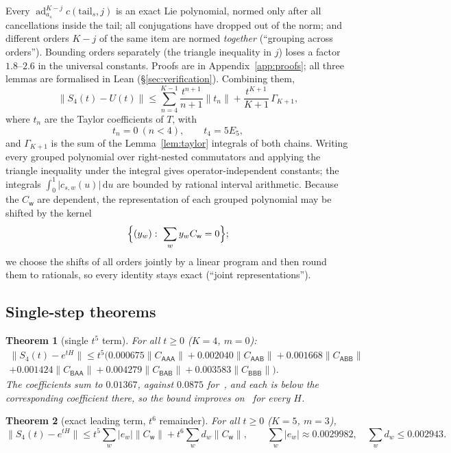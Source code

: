 \documentclass[11pt]{article}
\newcommand{\ad}{\operatorname{ad}}
\newcommand{\norm}[1]{\lVert #1\rVert}
\newcommand{\abs}[1]{\lvert #1\rvert}
\newcommand{\C}[1]{C_{\mathsf{#1}}}
\newcommand{\dd}{\,\mathrm{d}}
\theoremstyle{plain}
\newtheorem{theorem}{Theorem}
\theoremstyle{definition}
\theoremstyle{remark}
\begin{document}
Every $\ad_{a_s}^{K-j}c(\mathrm{tail}_s,j)$ is an exact Lie polynomial, normed only after all
cancellations inside the tail; all conjugations have dropped out of the norm; and different orders
$K-j$ of the same item are normed \emph{together} (``grouping across orders''). Bounding orders
separately (the triangle inequality in $j$) loses a factor $1.8$--$2.6$ in the universal constants.
Proofs are in Appendix~\ref{app:proofs}; all three lemmas are formalised in Lean
(\S\ref{sec:verification}). Combining them,
\begin{equation}\tag{$\star$}\label{eq:star}
\norm{S_4(t)-U(t)}\le\sum_{n=4}^{K-1}\frac{t^{n+1}}{n+1}\norm{t_n}+\frac{t^{K+1}}{K+1}\,\Gamma_{K+1},
\end{equation}
where $t_n$ are the Taylor coefficients of $T$, with
\[
t_n=0\ (n<4),\qquad t_4=5E_5,
\]
and $\Gamma_{K+1}$ is the sum of the Lemma~\ref{lem:taylor} integrals of both chains. Writing every grouped polynomial over right-nested
commutators and applying the triangle inequality under the integral gives operator-independent
constants; the integrals $\int_0^1\abs{c_{s,w}(u)}\dd u$ are bounded by rational interval arithmetic.
Because the $\C w$ are dependent, the representation of each grouped polynomial may be shifted by the
kernel
\[
\Bigl\{(y_w):\ \sum_wy_w\C w=0\Bigr\};
\]
we choose the shifts of all orders jointly by a linear program and then
round them to rationals, so every identity stays exact (``joint representations'').

\subsection{Single-step theorems}

\begin{theorem}[single $t^5$ term]\label{thm:A}
For all $t\ge0$ ($K=4$, $m=0$):
\begin{multline*}
\norm{S_4(t)-e^{tH}}\le t^5\bigl(0.000675\norm{\C{AAA}}+0.002040\norm{\C{AAB}}+0.001668\norm{\C{ABB}}\\
+0.001424\norm{\C{BAA}}+0.004279\norm{\C{BAB}}+0.003583\norm{\C{BBB}}\bigr).
\end{multline*}
The coefficients sum to $0.01367$, against $0.0875$ for~\cite[Prop.~J.1]{Childs2021}, and each is below
the corresponding coefficient there, so the bound improves on~\cite{Childs2021} for every $H$.
\end{theorem}

\begin{theorem}[exact leading term, $t^6$ remainder]\label{thm:B}
For all $t\ge0$ ($K=5$, $m=3$),
\[
\norm{S_4(t)-e^{tH}}\le t^5\sum_w\abs{e_w}\norm{\C w}+t^6\sum_wd_w\norm{\C w},\qquad
\textstyle\sum_w\abs{e_w}\approx0.0029982,\quad\sum_wd_w\le0.002943 .
\]
\end{theorem}
\end{document}
